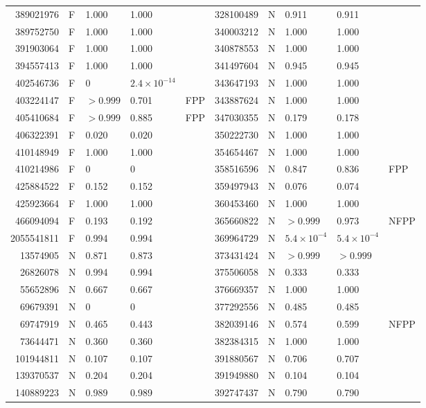 \documentclass[11pt]{article}
\begin{document}
\begin{center}
\begin{longtable}{rllll@{\hspace{2.5em}}rllll}
389021976 & F & 1.000 & 1.000 &  & 328100489 & N & 0.911 & 0.911 &  \\
389752750 & F & 1.000 & 1.000 &  & 340003212 & N & 1.000 & 1.000 &  \\
391903064 & F & 1.000 & 1.000 &  & 340878553 & N & 1.000 & 1.000 &  \\
394557413 & F & 1.000 & 1.000 &  & 341497604 & N & 0.945 & 0.945 &  \\
402546736 & F & 0 & $2.4\times10^{-14}$ &  & 343647193 & N & 1.000 & 1.000 &  \\
403224147 & F & $>0.999$ & 0.701 & FPP & 343887624 & N & 1.000 & 1.000 &  \\
405410684 & F & $>0.999$ & 0.885 & FPP & 347030355 & N & 0.179 & 0.178 &  \\
406322391 & F & 0.020 & 0.020 &  & 350222730 & N & 1.000 & 1.000 &  \\
410148949 & F & 1.000 & 1.000 &  & 354654467 & N & 1.000 & 1.000 &  \\
410214986 & F & 0 & 0 &  & 358516596 & N & 0.847 & 0.836 & FPP \\
425884522 & F & 0.152 & 0.152 &  & 359497943 & N & 0.076 & 0.074 &  \\
425923664 & F & 1.000 & 1.000 &  & 360453460 & N & 1.000 & 1.000 &  \\
466094094 & F & 0.193 & 0.192 &  & 365660822 & N & $>0.999$ & 0.973 & NFPP \\
2055541811 & F & 0.994 & 0.994 &  & 369964729 & N & $5.4\times10^{-4}$ & $5.4\times10^{-4}$ &  \\
13574905 & N & 0.871 & 0.873 &  & 373431424 & N & $>0.999$ & $>0.999$ &  \\
26826078 & N & 0.994 & 0.994 &  & 375506058 & N & 0.333 & 0.333 &  \\
55652896 & N & 0.667 & 0.667 &  & 376669357 & N & 1.000 & 1.000 &  \\
69679391 & N & 0 & 0 &  & 377292556 & N & 0.485 & 0.485 &  \\
69747919 & N & 0.465 & 0.443 &  & 382039146 & N & 0.574 & 0.599 & NFPP \\
73644471 & N & 0.360 & 0.360 &  & 382384315 & N & 1.000 & 1.000 &  \\
101944811 & N & 0.107 & 0.107 &  & 391880567 & N & 0.706 & 0.707 &  \\
139370537 & N & 0.204 & 0.204 &  & 391949880 & N & 0.104 & 0.104 &  \\
140889223 & N & 0.989 & 0.989 &  & 392747437 & N & 0.790 & 0.790 &  \\

\end{longtable}
\end{center}
\end{document}
